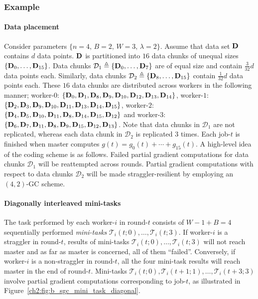 \subsubsection{Example}\label{ch2:sec:M_SGC_example}

\paragraph{Data placement} Consider parameters $\{n=4,\, B=2,\, W=3,\, \lambda=2\}$. Assume that data set $\mathbf{D}$ contains $d$ data points. $\mathbf{D}$ is partitioned into $16$ data chunks of unequal sizes $\{\mathbf{D}_0,\ldots,\mathbf{D}_{15}\}$. Data chunks $\mathcal{D}_1\triangleq \{\mathbf{D}_0,\ldots,\mathbf{D}_{7}\}$ are of equal size and  contain $\frac{3}{32}d$ data points each. Similarly, data chunks $\mathcal{D}_2\triangleq\{\mathbf{D}_8,\ldots,\mathbf{D}_{15}\}$ contain $\frac{1}{32}d$ data points  each. These $16$ data chunks are distributed across workers in the following manner; worker-$0$: $\{\mathbf{D}_0,\mathbf{D}_1,\mathbf{D}_8,\mathbf{D}_9,\mathbf{D}_{10},\mathbf{D}_{12},\mathbf{D}_{13},\mathbf{D}_{14}\}$,  worker-$1$: $\{\mathbf{D}_2,\mathbf{D}_3,\mathbf{D}_9,\mathbf{D}_{10},\mathbf{D}_{11},\mathbf{D}_{13},\mathbf{D}_{14},\mathbf{D}_{15}\}$, worker-$2$: $\{\mathbf{D}_4,\mathbf{D}_5,\mathbf{D}_{10},\mathbf{D}_{11},\mathbf{D}_{8},\mathbf{D}_{14},\mathbf{D}_{15},\mathbf{D}_{12}\}$ and worker-$3$: $\{\mathbf{D}_6,\mathbf{D}_7,\mathbf{D}_{11},\mathbf{D}_{8},\mathbf{D}_{9},\mathbf{D}_{15},\mathbf{D}_{12},\mathbf{D}_{13}\}$. Note that data chunks in $\mathcal{D}_1$ are not replicated, whereas each data chunk in $\mathcal{D}_2$ is replicated $3$ times. Each job-$t$ is finished when master computes $g(t)=g_0(t)+\cdots+g_{15}(t)$. A high-level idea of the coding scheme is as follows. Failed partial gradient computations for data chunks $\mathcal{D}_1$ will be reattempted across rounds. Partial gradient computations with respect to data chunks $\mathcal{D}_2$ will be made straggler-resilient by employing an $(4,2)$-GC scheme.

\paragraph{Diagonally interleaved mini-tasks} The task performed by each worker-$i$   in round-$t$ consists of $W-1+B=4$ sequentially performed \textit{mini-tasks} $\mathcal{T}_i(t;0),\ldots,\mathcal{T}_i(t;3)$. If worker-$i$ is a straggler in round-$t$,  results of mini-tasks $\mathcal{T}_i(t;0),\ldots,\mathcal{T}_i(t;3)$ will not reach master and as far as master is concerned, all of them ``failed''. Conversely, if worker-$i$ is a non-straggler in round-$t$, all the four mini-task results will reach master in the end of round-$t$. Mini-tasks $\mathcal{T}_i(t;0), \mathcal{T}_i(t+1;1), \ldots, \mathcal{T}_i(t+3;3)$ involve partial gradient computations corresponding to job-$t$, as illustrated in Figure~\ref{ch2:fig:b_sgc_mini_task_diagonal}.

